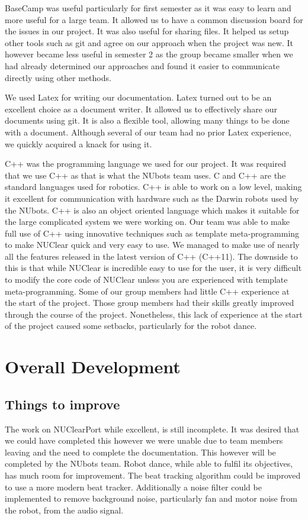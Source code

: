 \documentclass[english,12pt]{scrartcl}
\begin{document}
		BaseCamp was useful particularly for first semester as it was easy to learn and more useful for a large team. 
		It allowed us to have a common discussion board for the issues in our project. It was also useful for sharing files.
		It helped us setup other tools such as git and agree on our approach when the project was new.
		It however became less useful in semester 2 as the group became smaller when we had already determined our approaches and found it easier to communicate directly using other methods.

		We used Latex for writing our documentation. 
		Latex turned out to be an excellent choice as a document writer. 
		It allowed us to effectively share our documents using git.
		It is also a flexible tool, allowing many things to be done with a document.
		Although several of our team had no prior Latex experience, we quickly acquired a knack for using it.

		C++ was the programming language we used for our project. 
		It was required that we use C++ as that is what the NUbots team uses. 
		C and C++ are the standard languages used for robotics. 
		C++ is able to work on a low level, making it excellent for communication with hardware such as the Darwin robots used by the NUbots.
		C++ is also an object oriented language which makes it suitable for the large complicated system we were working on.
		Our team was able to make full use of C++ using innovative techniques such as template meta-programming to make NUClear quick and very easy to use.
		We managed to make use of nearly all the features released in the latest version of C++ (C++11).
		The downside to this is that while NUClear is incredible easy to use for the user, it is very difficult to modify the core code of NUClear unless you are experienced with template meta-programming.
		Some of our group members had little C++ experience at the start of the project.
		Those group members had their skills greatly improved through the course of the project.
		Nonetheless, this lack of experience at the start of the project caused some setbacks, particularly for the robot dance.
		
\section{Overall Development}
	\subsection{Things to improve}
		The work on NUClearPort while excellent, is still incomplete.
		It was desired that we could have completed this however we were unable due to team members leaving and the need to complete the documentation.
		This however will be completed by the NUbots team.
		Robot dance, while able to fulfil its objectives, has much room for improvement.
		The beat tracking algorithm could be improved to use a more modern beat tracker.
		Additionally a noise filter could be implemented to remove background noise, particularly fan and motor noise from the robot, from the audio signal.
	
\end{document}
